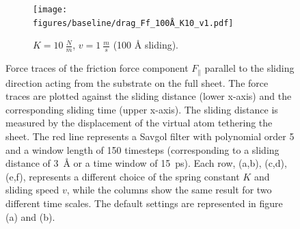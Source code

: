 \begin{figure}[H]
    \hfill
    \begin{subfigure}[t]{0.49\textwidth}
      \centering
      \texttt{[image: figures/baseline/drag\_Ff\_100Å\_K10\_v1.pdf]}
      \caption{$K = \SI{10}{\frac{N}{m}}$, $v = \SI{1}{\frac{m}{s}}$ (100 Å sliding).}
      \label{fig:drag_Ff_100_K10_v1}
  \end{subfigure}
  \hfill
     \caption{Force traces of the friction force component $F_\parallel$ parallel to the sliding direction acting from the substrate on the full sheet. The force traces are plotted against the sliding distance (lower x-axis) and the corresponding sliding time (upper x-axis). The sliding distance is measured by the displacement of the virtual atom tethering the sheet. The red line represents a Savgol filter with polynomial order 5 and a window length of 150 timesteps (corresponding to a sliding distance of \SI{3}{Å} or a time window of \SI{15}{ps}). Each row, (a,b), (c,d), (e,f), represents a different choice of the spring constant $K$ and sliding speed $v$, while the columns show the same result for two different time scales. The default settings are represented in figure (a) and (b).}
     \label{fig:drag_Ff}
\end{figure}

